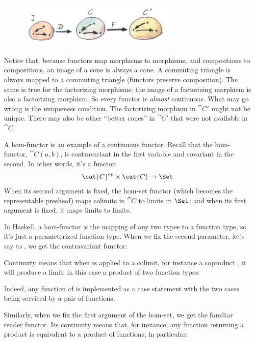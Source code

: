 \begin{figure}[H]
\centering
\includegraphics[width=3.12500in]{images/continuity.jpg}
\end{figure}

\noindent
Notice that, because functors map morphisms to morphisms, and
compositions to compositions, an image of a cone is always a cone. A
commuting triangle is always mapped to a commuting triangle (functors
preserve composition). The same is true for the factorizing morphisms:
the image of a factorizing morphism is also a factorizing morphism. So
every functor is \emph{almost} continuous. What may go wrong is the
uniqueness condition. The factorizing morphism in $\cat{C'}$ might not be
unique. There may also be other ``better cones'' in $\cat{C'}$ that were
not available in $\cat{C}$.

A hom-functor is an example of a continuous functor. Recall that the
hom-functor, $\cat{C}(a, b)$, is contravariant in the first variable
and covariant in the second. In other words, it's a functor:
\[\cat{C}^{op} \times \cat{C} \to \Set\]
When its second argument is fixed, the hom-set functor (which becomes
the representable presheaf) maps colimits in $\cat{C}$ to limits in
$\Set$; and when its first argument is fixed, it maps limits to
limits.

In Haskell, a hom-functor is the mapping of any two types to a function
type, so it's just a parameterized function type. When we fix the second
parameter, let's say to , we get the contravariant
functor:


Continuity means that when  is applied to a colimit,
for instance a coproduct , it will produce a limit;
in this case a product of two function types:

Indeed, any function of  is implemented as a case
statement with the two cases being serviced by a pair of functions.

Similarly, when we fix the first argument of the hom-set, we get the
familiar reader functor. Its continuity means that, for instance, any
function returning a product is equivalent to a product of functions; in
particular:

